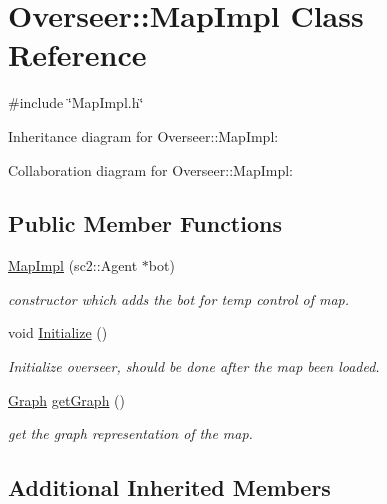 \hypertarget{classOverseer_1_1MapImpl}{}\section{Overseer\+:\+:Map\+Impl Class Reference}
\label{classOverseer_1_1MapImpl}


{\ttfamily \#include \char`\"{}Map\+Impl.\+h\char`\"{}}



Inheritance diagram for Overseer\+:\+:Map\+Impl\+:


Collaboration diagram for Overseer\+:\+:Map\+Impl\+:
\subsection*{Public Member Functions}
\begin{DoxyCompactItemize}
\item 
\hyperlink{classOverseer_1_1MapImpl_a9c30887c6f342971fabd54d23b36a765}{Map\+Impl} (sc2\+::\+Agent $\ast$bot)
\begin{DoxyCompactList}\small\item\em constructor which adds the bot for temp control of map. \end{DoxyCompactList}\item 
void \hyperlink{classOverseer_1_1MapImpl_a5ec5b37d1ae07732a99845bfbbfce016}{Initialize} ()\hypertarget{classOverseer_1_1MapImpl_a5ec5b37d1ae07732a99845bfbbfce016}{}\label{classOverseer_1_1MapImpl_a5ec5b37d1ae07732a99845bfbbfce016}

\begin{DoxyCompactList}\small\item\em Initialize overseer, should be done after the map been loaded. \end{DoxyCompactList}\item 
\hyperlink{classOverseer_1_1Graph}{Graph} \hyperlink{classOverseer_1_1MapImpl_abedbb01faa88ff9bd3f8cd2dbec0dead}{get\+Graph} ()\hypertarget{classOverseer_1_1MapImpl_abedbb01faa88ff9bd3f8cd2dbec0dead}{}\label{classOverseer_1_1MapImpl_abedbb01faa88ff9bd3f8cd2dbec0dead}

\begin{DoxyCompactList}\small\item\em get the graph representation of the map. \end{DoxyCompactList}\end{DoxyCompactItemize}
\subsection*{Additional Inherited Members}


